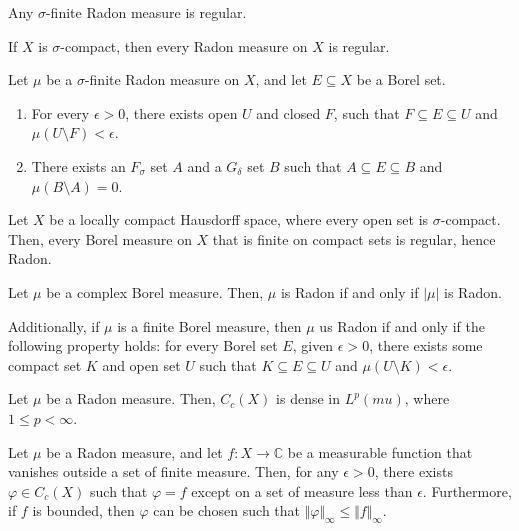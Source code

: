 \documentclass[11pt]{article}
\renewcommand{\C}{\mathbb{C}}
\newcommand{\norm}[1]{\Vert #1 \Vert}
\theoremstyle{definition}
\theoremstyle{remark}
\begin{document}
    \begin{corollary}
        Any $\sigma$-finite Radon measure is regular.
    \end{corollary}
    \begin{corollary}
        If $X$ is $\sigma$-compact, then every Radon measure on $X$ is regular.
    \end{corollary}


    \begin{lemma}
        Let $\mu$ be a $\sigma$-finite Radon measure on $X$, and let $E \subseteq X$
        be a Borel set. \begin{enumerate}
            \item For every $\epsilon > 0$, there exists open $U$ and closed $F$,
            such that $F \subseteq E \subseteq U$ and $\mu(U \setminus F) <
            \epsilon$.
            \item There exists an $F_\sigma$ set $A$ and a $G_\delta$ set $B$ such
            that $A \subseteq E \subseteq B$ and $\mu(B \setminus A) = 0$.
        \end{enumerate}
    \end{lemma}

    \begin{theorem}
        Let $X$ be a locally compact Hausdorff space, where every open set is
        $\sigma$-compact. Then, every Borel measure on $X$ that is finite on compact
        sets is regular, hence Radon.
    \end{theorem}

    \begin{lemma}
        Let $\mu$ be a complex Borel measure. Then, $\mu$ is Radon if and only if
        $|\mu|$ is Radon.

        Additionally, if $\mu$ is a finite Borel measure, then $\mu$ us Radon if and
        only if the following property holds: for every Borel set $E$, given
        $\epsilon > 0$, there exists some compact set $K$ and open set $U$ such that
        $K \subseteq E \subseteq U$ and $\mu(U \setminus K) < \epsilon$.
    \end{lemma}

    \begin{lemma}
        Let $\mu$ be a Radon measure. Then, $C_c(X)$ is dense in $L^p(mu)$, where $1
        \leq p < \infty$.
    \end{lemma}

    \begin{theorem}[Lusin]
        Let $\mu$ be a Radon measure, and let $f\colon X \to \C$ be a measurable
        function that vanishes outside a set of finite measure. Then, for any
        $\epsilon > 0$, there exists $\varphi \in C_c(X)$ such that $\varphi = f$
        except on a set of measure less than $\epsilon$. Furthermore, if $f$ is
        bounded, then $\varphi$ can be chosen such that $\norm{\varphi}_\infty \leq
        \norm{f}_\infty$.
    \end{theorem}
\end{document}

